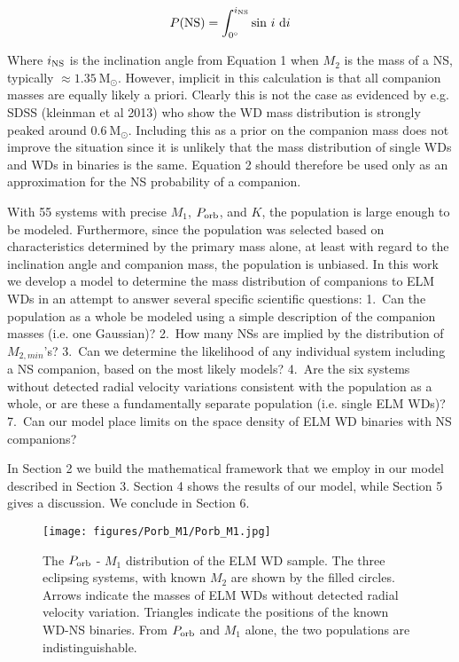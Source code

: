\documentclass[letterpaper,12pt,preprint]{aastex}
\newcommand{\Msun}{\mathrm{M}_\odot}
\begin{document}
\begin{equation}
P({\rm NS}) = \int_{0^{\circ}}^{i_{\rm NS}} {\rm sin}\ i\ {\rm d}i
\end{equation}

Where $i_{\rm NS}$ is the inclination angle from Equation 1 when $M_2$ is the mass of a NS, typically $\approx1.35~\Msun$. However, implicit in this calculation is that all companion masses are equally likely a priori. Clearly this is not the case as evidenced by e.g. SDSS (kleinman et al 2013) who show the WD mass distribution is strongly peaked around $0.6~\Msun$. Including this as a prior on the companion mass does not improve the situation since it is unlikely that the mass distribution of single WDs and WDs in binaries is the same. Equation 2 should therefore be used only as an approximation for the NS probability of a companion.


With 55 systems with precise $M_1$, $P_{\rm orb}$, and $K$, the population is large enough to be modeled. Furthermore, since the population was selected based on characteristics determined by the primary mass alone, at least with regard to the inclination angle and companion mass, the population is unbiased. In this work we develop a model to determine the mass distribution of companions to ELM WDs in an attempt to answer several specific scientific questions: 1.\ Can the population as a whole be modeled using a simple description of the companion masses (i.e. one Gaussian)? 2.\ How many NSs are implied by the distribution of $M_{2,min}$'s? 3.\ Can we determine the likelihood of any individual system including a NS companion, based on the most likely models? 4.\ Are the six systems without detected radial velocity variations consistent with the population as a whole, or are these a fundamentally separate population (i.e. single ELM WDs)? 7.\ Can our model place limits on the space density of ELM WD binaries with NS companions? 


In Section 2 we build the mathematical framework that we employ in our model described in Section 3. Section 4 shows the results of our model, while Section 5 gives a discussion. We conclude in Section 6.

\begin{figure}[h!]
\begin{center}
\texttt{[image: figures/Porb\_M1/Porb\_M1.jpg]}
\caption{The $P_{\rm orb}$ - $M_1$ distribution of the ELM WD sample. The three eclipsing systems, with known $M_2$ are shown by the filled circles. Arrows indicate the masses of ELM WDs without detected radial velocity variation. Triangles indicate the positions of the known WD-NS binaries. From $P_{\rm orb}$ and $M_1$ alone, the two populations are indistinguishable.}
\end{center}
\end{figure}
\end{document}
